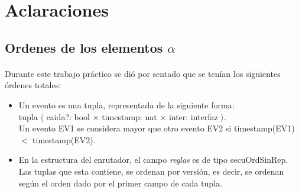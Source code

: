 \section*{Aclaraciones}

\subsection*{Ordenes de los elementos $\alpha$}
\paragraph{}
Durante este trabajo pr\'actico se di\'o por sentado que se ten\'ian los siguientes \'ordenes totales:

\begin{itemize}
 \item Un evento es una tupla, representada de la siguiente forma: \\
tupla $\langle$ caida?: bool  $\times$ timestamp: nat $\times$ inter: interfaz  $\rangle$.\\
Un evento EV1 se considera mayor que otro evento EV2 si timestamp(EV1) $<$ timestamp(EV2).
\item En la estructura del enrutador, el campo \textit{reglas} es de tipo secuOrdSinRep. Las tuplas que esta contiene, se ordenan por versi\'on, es decir, se ordenan seg\'un el orden dado por el primer campo de cada tupla.
\end{itemize}





